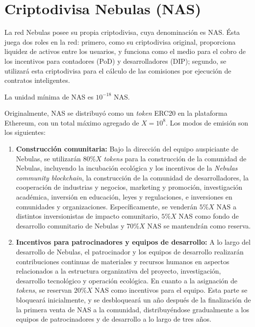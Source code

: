 \section{Criptodivisa Nebulas (NAS)}
\label{sec:nascoin}

La red Nebulas posee su propia criptodivisa, cuya denominación es NAS. Ésta juega dos roles en la red: primero, como su criptodivisa original, proporciona liquidez de activos entre los usuarios, y funciona como el medio para el cobro de los incentivos para contadores (PoD) y desarrolladores (DIP); segundo, se utilizará esta criptodivisa para el cálculo de las comisiones por ejecución de contratos inteligentes.

La unidad mínima de NAS es $10^{-18}$ NAS.

Originalmente, NAS se distribuyó como un \textit{token} ERC20 en la plataforma Ethereum, con un total máximo agregado de $X = 10^8.$ Los modos de emisión son los siguientes:

\begin{enumerate}
	\item \textbf{Construcción comunitaria:}
	Bajo la dirección del equipo auspiciante de Nebulas, se utilizarán $80\%X$ \textit{tokens} para la construcción de la comunidad de Nebulas, incluyendo la incubación ecológica y los incentivos de la \dapp \textit{Nebulas community blockchain}, la construcción de la comunidad de desarrolladores, la cooperación de industrias y negocios, marketing y promoción, investigación académica, inversión en educación, leyes y regulaciones, e inversiones en comunidades y organizaciones. Específicamente, se venderán $5\%X$ NAS a distintos inversionistas de impacto comunitario, $5\%X$ NAS como fondo de desarrollo comunitario de Nebulas y $70\%X$ NAS se mantendrán como reserva.

	\item \textbf{Incentivos para patrocinadores y equipos de desarrollo:}
	A lo largo del desarrollo de Nebulas, el patrocinador y los equipos de desarrollo realizarán contribuciones continuas de materiales y recursos humanos en aspectos relacionados a la estructura organizativa del proyecto, investigación, desarrollo tecnológico y operación ecológica. En cuanto a la asignación de \textit{tokens}, se reservan $20\%X$ NAS como incentivos para el equipo. Esta parte se bloqueará inicialmente, y se desbloqueará un año después de la finalización de la primera venta de NAS a la comunidad, distribuyéndose gradualmente a los equipos de patrocinadores y de desarrollo a lo largo de tres años.

\end{enumerate}

